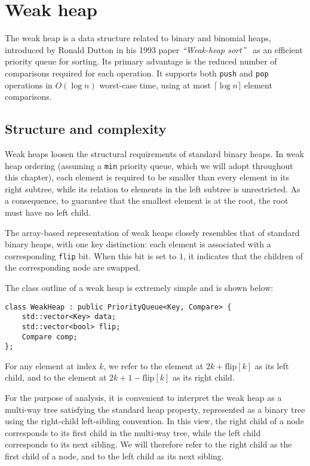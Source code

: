 \section{Weak heap}

The weak heap is a data structure related to binary and binomial heaps, introduced by Ronald Dutton in his 1993 paper \emph{``Weak-heap sort''}~\cite{Dutton1993} as an efficient priority queue for
sorting. Its primary advantage is the reduced number of comparisons required for each operation. It supports both \texttt{push} and \texttt{pop} operations in \( O(\log n) \) worst-case time, using at most \( \lceil \log n \rceil \) element comparisons.

\subsection{Structure and complexity}

Weak heaps loosen the structural requirements of standard binary heaps. In weak heap ordering (assuming a \texttt{min} priority queue, which we will adopt throughout this chapter), each element is required to be smaller than every element in its right subtree, while its relation to elements in the left subtree is unrestricted. As a consequence, to guarantee that the smallest element is at the root, the root must have no left child.

The array-based representation of weak heaps closely resembles that of standard binary heaps, with one key distinction: each element is associated with a corresponding \texttt{flip} bit. When this bit is set to \(1\), it indicates that the children of the corresponding node are swapped.

The class outline of a weak heap is extremely simple and is shown below:

\begin{verbatim}
class WeakHeap : public PriorityQueue<Key, Compare> {
    std::vector<Key> data;
    std::vector<bool> flip;
    Compare comp;
};
\end{verbatim}

For any element at index \(k\), we refer to the element at \(2k + \text{flip}[k]\) as its left child, and to the element at \(2k + 1 - \text{flip}[k]\) as its right child. 

For the purpose of analysis, it is convenient to interpret the weak heap as a multi-way tree satisfying the standard heap property, represented as a binary tree using the right-child left-sibling convention. In this view, the right child of a node corresponds to its first child in the multi-way tree, while the left child corresponds to its next sibling. We will therefore refer to the right child as the first child of a node, and to the left child as its next sibling.

